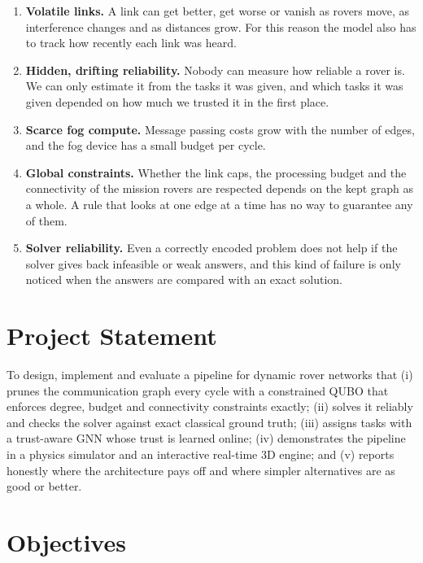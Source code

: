 \begin{enumerate}[label=\arabic*.]
\item \textbf{Volatile links.} A link can get better, get worse or vanish as
rovers move, as interference changes and as distances grow. For this reason the
model also has to track how recently each link was heard.
\item \textbf{Hidden, drifting reliability.} Nobody can measure how reliable a
rover is. We can only estimate it from the tasks it was given, and which tasks
it was given depended on how much we trusted it in the first place.
\item \textbf{Scarce fog compute.} Message passing costs grow with the number
of edges, and the fog device has a small budget per cycle.
\item \textbf{Global constraints.} Whether the link caps, the processing
budget and the connectivity of the mission rovers are respected depends on the
kept graph as a whole. A rule that looks at one edge at a time has no way to
guarantee any of them.
\item \textbf{Solver reliability.} Even a correctly encoded problem does not
help if the solver gives back infeasible or weak answers, and this kind of
failure is only noticed when the answers are compared with an exact
solution.
\end{enumerate}

\section{Project Statement}

To design, implement and evaluate a pipeline for dynamic rover networks that
(i) prunes the communication graph every cycle with a constrained QUBO that
enforces degree, budget and connectivity constraints exactly; (ii) solves it
reliably and checks the solver against exact classical ground truth; (iii)
assigns tasks with a trust-aware GNN whose trust is learned online; (iv)
demonstrates the pipeline in a physics simulator and an interactive real-time
3D engine; and (v) reports honestly where the architecture pays off and where
simpler alternatives are as good or better.

\section{Objectives}

